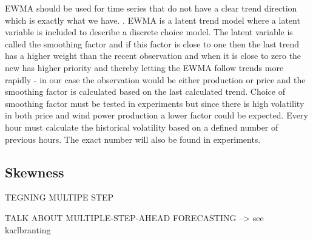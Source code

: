 EWMA should be used for time series that do not have a clear trend direction\cite[Chapter~7.3.2]{econometrics} which is exactly what we have. . EWMA is a latent trend model where a latent variable is included to describe a discrete choice model. The latent variable is called the smoothing factor and if this factor is close to one then the last trend has a higher weight than the recent observation and when it is close to zero the new has higher priority and thereby letting the EWMA follow trends more rapidly - in our case the observation would be either production or price and the smoothing factor is calculated based on the last calculated trend. Choice of smoothing factor must be tested in experiments but since there is high volatility in both price and wind power production a lower factor could be expected. Every hour must calculate the historical volatility based on a defined number of previous hours. The exact number will also be found in experiments.

\subsection{Skewness}
\label{sec:skewness}



TEGNING MULTIPE STEP

TALK ABOUT MULTIPLE-STEP-AHEAD FORECASTING --> see karlbranting
